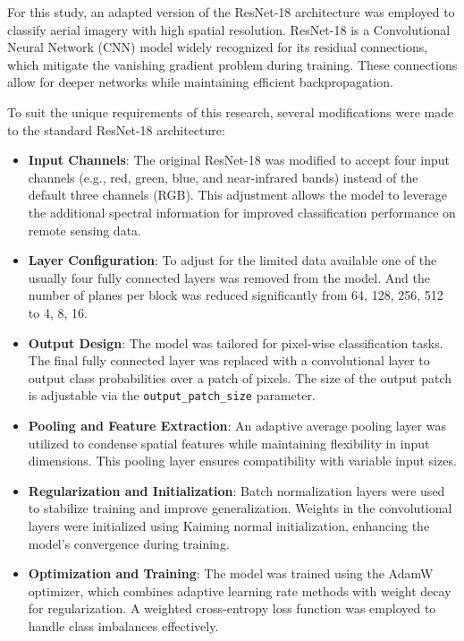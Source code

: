 For this study, an adapted version of the ResNet-18 architecture was employed to classify 
aerial imagery with high spatial resolution. ResNet-18 is a Convolutional Neural Network 
(CNN) model widely recognized for its residual connections, which mitigate the vanishing 
gradient problem during training. These connections allow for deeper networks while 
maintaining efficient backpropagation.

To suit the unique requirements of this research, several modifications were made to the 
standard ResNet-18 architecture:

\begin{itemize}
    \item \textbf{Input Channels}: The original ResNet-18 was modified to accept four input 
    channels (e.g., red, green, blue, and near-infrared bands) instead of the default 
    three channels (RGB). This adjustment allows the model to leverage the additional 
    spectral information for improved classification performance on remote sensing data.

    \item \textbf{Layer Configuration}: To adjust for the limited data available one
    of the usually four fully connected layers was removed from the model. And the
    number of planes per block was reduced significantly from 64, 128, 256, 512 to 4, 8, 16.

    \item \textbf{Output Design}: The model was tailored for pixel-wise classification 
    tasks. The final fully connected layer was replaced with a convolutional layer to 
    output class probabilities over a patch of pixels. The size of the output patch is 
    adjustable via the \texttt{output\_patch\_size} parameter.

    \item \textbf{Pooling and Feature Extraction}: An adaptive average pooling layer was 
    utilized to condense spatial features while maintaining flexibility in input 
    dimensions. This pooling layer ensures compatibility with variable input sizes.

    \item \textbf{Regularization and Initialization}: Batch normalization layers were used 
    to stabilize training and improve generalization. Weights in the convolutional layers 
    were initialized using Kaiming normal initialization, enhancing the model's 
    convergence during training.

    \item \textbf{Optimization and Training}: The model was trained using the AdamW 
    optimizer, which combines adaptive learning rate methods with weight decay for 
    regularization. A weighted cross-entropy loss function was employed to handle class 
    imbalances effectively.
\end{itemize}


